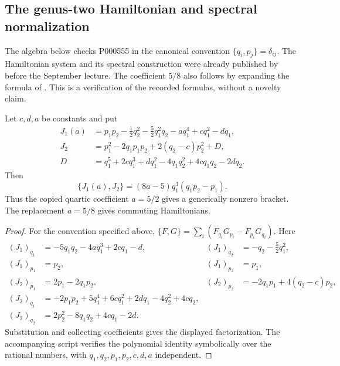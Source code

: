 \subsection{The genus-two Hamiltonian and spectral normalization}

The algebra below checks P000555 in the canonical convention \(\{q_i,p_j\}=\delta_{ij}\). The Hamiltonian system and its spectral construction were already published by \citet[\S2, pp.~64--65]{novikov1974periodic} before the September lecture. The coefficient \(5/8\) also follows by expanding the formula of \citet[\S4]{dubrovinnovikov1974periodicity}. This is a verification of the recorded formulas, without a novelty claim.

\begin{proposition}\leavevmode\par\noindent\oursComputed\quad
Let \(c,d,a\) be constants and put
\begin{align*}
 J_1(a)&=p_1p_2-\frac12q_2^2-\frac52q_1^2q_2-aq_1^4+cq_1^2-dq_1,\\
 J_2&=p_1^2-2q_1p_1p_2+2(q_2-c)p_2^2+D,\\
 D&=q_1^5+2cq_1^3+dq_1^2-4q_1q_2^2+4cq_1q_2-2dq_2.
\end{align*}
Then
\[
 \{J_1(a),J_2\}=(8a-5)q_1^3(q_1p_2-p_1).
\]
Thus the copied quartic coefficient \(a=5/2\) gives a generically nonzero bracket. The replacement \(a=5/8\) gives commuting Hamiltonians.
\end{proposition}
\begin{proof}
For the convention specified above,
\(\{F,G\}=\sum_i(F_{q_i}G_{p_i}-F_{p_i}G_{q_i})\).
Here
\begin{align*}
 (J_1)_{q_1}&=-5q_1q_2-4aq_1^3+2cq_1-d,&
 (J_1)_{q_2}&=-q_2-\tfrac52q_1^2,\\
 (J_1)_{p_1}&=p_2,&(J_1)_{p_2}&=p_1,\\
 (J_2)_{p_1}&=2p_1-2q_1p_2,&
 (J_2)_{p_2}&=-2q_1p_1+4(q_2-c)p_2,\\
 (J_2)_{q_1}&=-2p_1p_2+5q_1^4+6cq_1^2+2dq_1-4q_2^2+4cq_2,\\
 (J_2)_{q_2}&=2p_2^2-8q_1q_2+4cq_1-2d.
\end{align*}
Substitution and collecting coefficients gives the displayed factorization. The accompanying script verifies the polynomial identity symbolically over the rational numbers, with \(q_1,q_2,p_1,p_2,c,d,a\) independent.
\end{proof}


